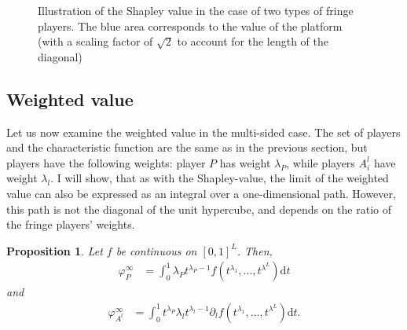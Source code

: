 \documentclass[a4paper]{article}
\newtheorem{proposition}{Proposition}
\newcommand{\dt}{\mathrm{d}t}
\begin{document}
\begin{figure}
    \centering
    \caption{Illustration of the Shapley value in the case of two types of fringe players. The blue area corresponds to the value of the platform (with a scaling factor of $\sqrt{2}$ to account for the length of the diagonal)}
    \label{fig:many_sided_shapley}
\end{figure}


\subsection{Weighted value}

Let us now examine the weighted value in the multi-sided case.
The set of players and the characteristic function are the same as in the previous section, but players have the following weights: player $P$ has weight $\lambda_P$, while players $A^l_i$ have weight $\lambda_l$.
I will show, that as with the Shapley-value, the limit of the weighted value can also be expressed as an integral over a one-dimensional path.
However, this path is not the diagonal of the unit hypercube, and depends on the ratio of the fringe players' weights.

\begin{proposition}
    \label{prop:many_sided_weighted}
    Let $f$ be continuous on $[0, 1]^L$.
    Then,
    \begin{align*}
        \varphi_P^\infty & = \int_0^1 \lambda_P t^{\lambda_P - 1} f(t^{\lambda_1}, \dots, t^{\lambda^L}) \dt
    \end{align*}
    and
    \begin{align*}
        \varphi_{A^l}^\infty & = \int_0^1 t^{\lambda_P} \lambda_l t^{\lambda_l - 1} \partial_l f(t^{\lambda_1}, \dots, t^{\lambda^L}) \dt.
    \end{align*}
\end{proposition}
\end{document}
